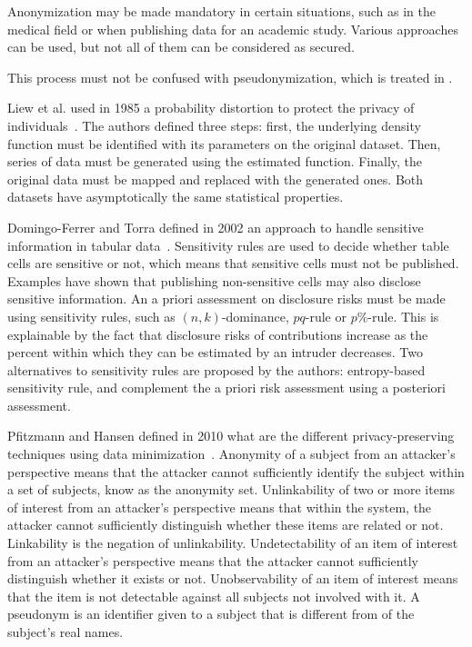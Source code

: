 Anonymization may be made mandatory in certain situations, such as in the medical field or when publishing data for an academic study. Various approaches can be used, but not all of them can be considered as secured.

This process must not be confused with pseudonymization, which is treated in .

Liew et al. used in 1985 a probability distortion to protect the privacy of individuals~\cite{liew_data_1985}. The authors defined three steps: first, the underlying density function must be identified with its parameters on the original dataset. Then, series of data must be generated using the estimated function. Finally, the original data must be mapped and replaced with the generated ones. Both datasets have asymptotically the same statistical properties. %

Domingo-Ferrer and Torra defined in 2002 an approach to handle sensitive information in tabular data~\cite{domingo-ferrer_critique_2002}. Sensitivity rules are used to decide whether table cells are sensitive or not, which means that sensitive cells must not be published. Examples have shown that publishing non-sensitive cells may also disclose sensitive information. An a priori assessment on disclosure risks must be made using sensitivity rules, such as $(n, k)$-dominance, $pq$-rule or $p\%$-rule. This is explainable by the fact that disclosure risks of contributions increase as the percent within which they can be estimated by an intruder decreases. Two alternatives to sensitivity rules are proposed by the authors: entropy-based sensitivity rule, and complement the a priori risk assessment using a posteriori assessment. %

Pfitzmann and Hansen defined in 2010 what are the different privacy-preserving techniques using data minimization~\cite{pfitzmann_terminology_2010}. Anonymity of a subject from an attacker's perspective means that the attacker cannot sufficiently identify the subject within a set of subjects, know as the anonymity set. Unlinkability of two or more items of interest from an attacker's perspective means that within the system, the attacker cannot sufficiently distinguish whether these items are related or not. Linkability is the negation of unlinkability. Undetectability of an item of interest from an attacker's perspective means that the attacker cannot sufficiently distinguish whether it exists or not. Unobservability of an item of interest means that the item is not detectable against all subjects not involved with it. A pseudonym is an identifier given to a subject that is different from of the subject's real names. %

